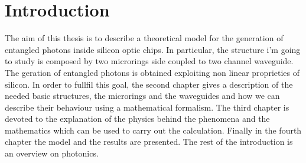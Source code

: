 \documentclass[12pt]{book}
\begin{document}

\tableofcontents
\chapter{Introduction}
The aim of this thesis is to describe a theoretical model for the generation of entangled photons inside silicon optic chips. In particular, the structure i'm going to study is composed by two microrings side coupled to two channel waveguide. The geration of entangled photons is obtained exploiting non linear proprieties of silicon. In order to fullfil this goal, the second chapter gives a description of the needed basic structures, the microrings and the waveguides and how we can describe their behaviour using a mathematical formalism. The third chapter is devoted to the explanation of the physics behind the phenomena and the mathematics which can be used to carry out the calculation. Finally in the fourth chapter the model and the results are presented. The rest of the introduction is an overview on photonics. 
\end{document}
